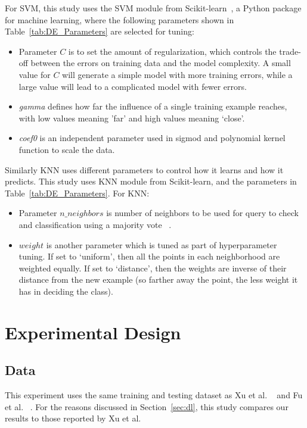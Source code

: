 \documentclass[sigconf]{acmart}
\newcommand{\bi}{\begin{itemize}[leftmargin=0.4cm]}
\newcommand{\ei}{\end{itemize}}
\theoremstyle{break}
\begin{document}
    
    For SVM, this study uses the SVM module from Scikit-learn~\cite{pedregosa2011scikit}, a Python package for machine learning, where the following parameters shown in Table~\ref{tab:DE_Parameters} are selected for tuning:
    \bi
    \item
    Parameter $C$ is to set the amount of regularization, which controls the trade-off between the errors on training data and the model complexity. A small value for $C$ will generate a simple model with more training errors, while a large value will lead to a complicated model with fewer errors. 
    \item 
    {\em gamma} defines how far the influence of a single training example reaches, with low values meaning 'far' and high values meaning `close'.
    \item
    {\em coef0} is an independent parameter used in sigmod and polynomial kernel function to scale the data.
    \ei
    Similarly KNN uses different parameters to control how it learns and how it predicts. This study uses KNN module from Scikit-learn, and the parameters in   Table~\ref{tab:DE_Parameters}. For KNN:
    \bi
    \item Parameter $n\_neighbors$ is number of neighbors to be used for query to check and   classification using a  majority vote ~\cite{guo2003knn}. 
    \item
    $weight$ is another parameter which is tuned as part of hyperparameter tuning. If set to `uniform', then   all the points in each neighborhood are weighted equally. If set
    to `distance', then the weights are inverse of their distance from the new example (so farther away the point, the less weight  it has in deciding the class).
    \ei
    
   
    




\section{Experimental Design}
\label{sect: Experimental Design}
    \subsection{Data}
    \label{sssec:Data}
    This experiment uses the same training and testing dataset as Xu et al. ~\cite{xu2016predicting} and Fu et al. ~\cite{fu2017easy}. For the reasons discussed
    in Section~\ref{sec:dl}, this study compares our results to those reported by  Xu et al.  
    
\end{document}
